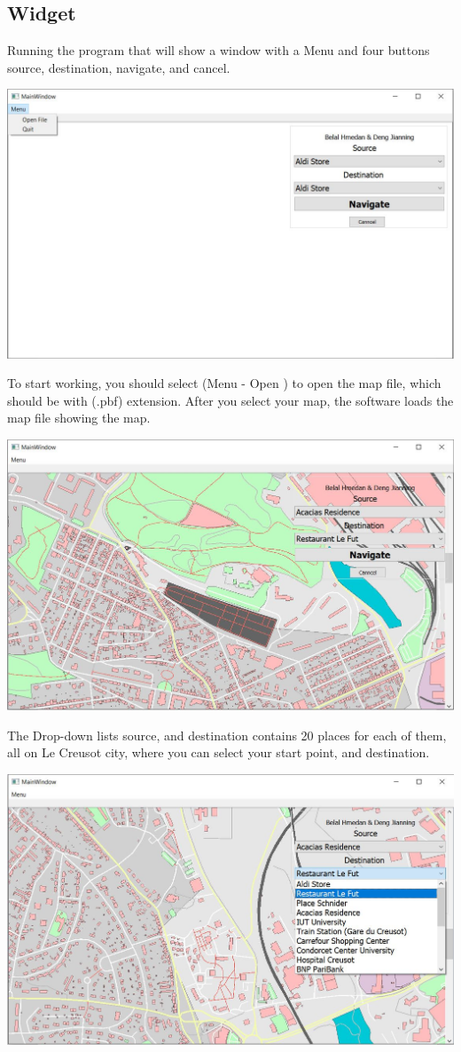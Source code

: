 \documentclass[a4paper, 12pt, english]{book}
\begin{document}
\subsection{Widget}
Running the program that will show a window with a Menu and four buttons source, destination, navigate, and cancel.
\begin{center}
\includegraphics[width=.6\textwidth]{GUI_NoMap.JPG}
\end{center}
To start working, you should select (Menu - Open )
to open the map file, which should be with (.pbf) extension.
After you select your map, the software loads the map file showing the map.
\begin{center}
\includegraphics[width=.6\textwidth]{GUI_Map0.JPG}
\end{center}
The Drop-down lists source, and destination contains 20 places for each of them, all on Le Creusot city, where you can select your start point, and destination.
\begin{center}
\includegraphics[width=.6\textwidth]{GUI_Map1.JPG}
\end{center}
\end{document}

